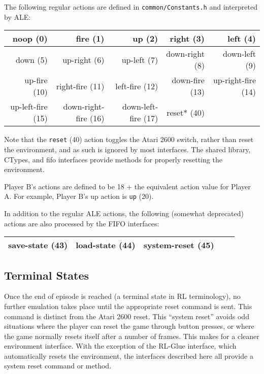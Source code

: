 \documentclass[12pt]{article}
\begin{document}
The following regular actions are defined in \verb+common/Constants.h+ and interpreted by ALE:

\begin{center}
\small{
\begin{tabular}{|r|r|r|r|r|}
\hline
noop (0) & fire (1) & up (2) & right (3) & left (4) \\
\hline
down (5) & up-right (6) & up-left (7) & down-right (8) & down-left (9) \\
\hline
up-fire (10) & right-fire (11) & left-fire (12) & down-fire (13) & up-right-fire (14) \\
\hline
up-left-fire (15) & down-right-fire (16) & down-left-fire (17) & reset* (40) & \\
\hline
\end{tabular}
}
\end{center}

Note that the \verb+reset+ (40) action toggles the Atari 2600 switch, rather than reset the 
environment, and as such is ignored by most interfaces. The shared library, CTypes, and fifo
interfaces provide methods for properly resetting the environment. 

Player B's actions are defined to be 18 + the equivalent action value for Player A. For example, Player B's up action is \verb+up+ (20). 

In addition to the regular ALE actions, the following (somewhat deprecated) actions are also processed by the 
FIFO interfaces:

\begin{center}
\begin{tabular}{|r|r|r|r|r|}
\hline
save-state (43) & load-state (44) & system-reset (45) \\
\hline
\end{tabular}
\end{center}

\subsection{Terminal States}

Once the end of episode is reached (a terminal state in RL terminology), no further emulation 
takes place until the appropriate reset command is sent. This command is distinct from the Atari 
2600 reset. This ``system reset'' avoids odd situations where the player can reset the game
through button presses, or where the game normally resets itself after a number of frames. This 
makes for a cleaner environment interface. With the exception of the RL-Glue interface, which 
automatically resets the environment, the interfaces described here all provide a system reset
command or method.
\end{document}
